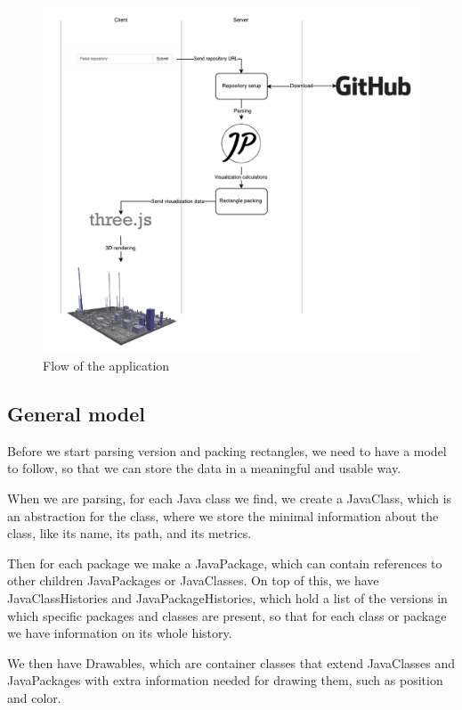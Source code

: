 \documentclass[]{usiinfbachelorproject}
\begin{document}
\begin{figure} [H]
\centering
\includegraphics[width=1\textwidth]{pictures/flow.pdf}
\caption{Flow of the application}
\label{fig:flow}
\end{figure}

\subsection{General model} \label{General model}
Before we start parsing version and packing rectangles, we need to have a model to follow, so that we can store the data in a meaningful and usable way.

When we are parsing, for each Java class we find, we create a JavaClass, which is an abstraction for the class, where we store the minimal information about the class, like its name, its path, and its metrics.

Then for each package we make a JavaPackage, which can contain references to other children JavaPackages or JavaClasses.
On top of this, we have JavaClassHistories and JavaPackageHistories, which hold a list of the versions in which specific packages and classes are present, so that for each class or package we have information on its whole history.

We then have Drawables, which are container classes that extend JavaClasses and JavaPackages with extra information needed for drawing them, such as position and color.
\end{document}
